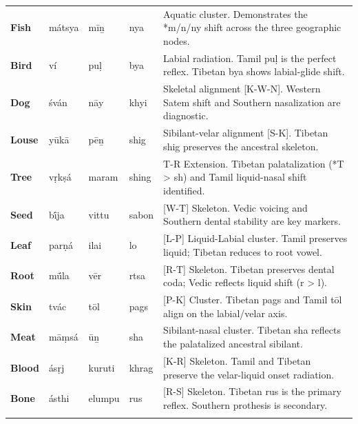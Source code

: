 \documentclass[11pt,oneside,openany]{book}
\begin{document}
\begin{longtable}{p{} p{} p{} p{} p{}}
\textbf{Fish} & mátsya & mīṉ & nya & \small Aquatic cluster. Demonstrates the *m/n/ny shift across the three geographic nodes. \\ 
\addlinespace[10pt]

\textbf{Bird} & ví & puḷ & bya & \small Labial radiation. Tamil puḷ is the perfect reflex. Tibetan bya shows labial-glide shift. \\ 
\addlinespace[10pt]

\textbf{Dog} & śván & nāy & khyi & \small Skeletal alignment [K-W-N]. Western Satem shift and Southern nasalization are diagnostic. \\ 
\addlinespace[10pt]

\textbf{Louse} & yūkā & pēṉ & shig & \small Sibilant-velar alignment [S-K]. Tibetan shig preserves the ancestral skeleton. \\ 
\addlinespace[10pt]

\textbf{Tree} & vṛkṣá & maram & shing & \small *T-R Extension. Tibetan palatalization (*T > sh) and Tamil liquid-nasal shift identified. \\ 
\addlinespace[10pt]

\textbf{Seed} & bī́ja & vittu & sabon & \small [W-T] Skeleton. Vedic voicing and Southern dental stability are key markers. \\ 
\addlinespace[10pt]

\textbf{Leaf} & parṇá & ilai & lo & \small [L-P] Liquid-Labial cluster. Tamil preserves liquid; Tibetan reduces to root vowel. \\ 
\addlinespace[10pt]

\textbf{Root} & mū́la & vēr & rtsa & \small [R-T] Skeleton. Tibetan preserves dental coda; Vedic reflects liquid shift (r > l). \\ 
\addlinespace[10pt]

\textbf{Skin} & tvác & tōl & pags & \small [P-K] Cluster. Tibetan pags and Tamil tōl align on the labial/velar axis. \\ 
\addlinespace[10pt]

\textbf{Meat} & māṃsá & ūṉ & sha & \small Sibilant-nasal cluster. Tibetan sha reflects the palatalized ancestral sibilant. \\ 
\addlinespace[10pt]

\textbf{Blood} & ásṛj & kuruti & khrag & \small [K-R] Skeleton. Tamil and Tibetan preserve the velar-liquid onset radiation. \\ 
\addlinespace[10pt]

\textbf{Bone} & ásthi & elumpu & rus & \small [R-S] Skeleton. Tibetan rus is the primary reflex. Southern prothesis is secondary. \\ 
\addlinespace[10pt]


\end{longtable}
\end{document}
